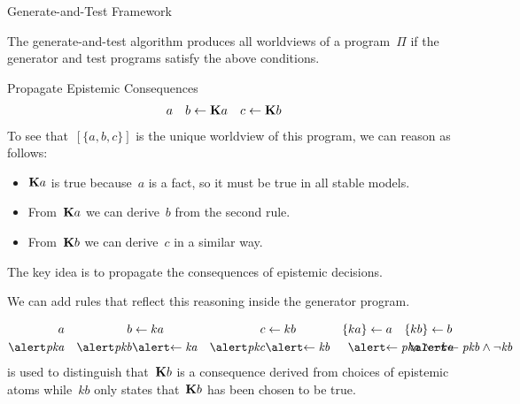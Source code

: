 \documentclass[aspectratio=169,svgnames,xcolor=table,t]{beamer}
\begin{document}
\begin{frame}{Generate-and-Test Framework}
    \vspace{10pt}

    \begin{theorem}
        The generate-and-test algorithm produces all worldviews of a program~$\Pi$ if the generator and test programs satisfy the above conditions.
    \end{theorem}
\end{frame}
\begin{frame}{Propagate Epistemic Consequences}
    \vspace{-20pt}
    \begin{align*}
        a &&
        b &\leftarrow \mathbf{K} a
        &
        c &\leftarrow \mathbf{K} b
    \end{align*}
    To see that~$[\{a,b,c\}]$ is the unique worldview of this program, we can reason as follows:
    \begin{itemize}
        \item $\mathbf{K} a$ is true because~$a$ is a fact, so it must be true in all stable models.
        \item From~$\mathbf{K} a$ we can derive~$b$ from the second rule. 
        \item From~$\mathbf{K} b$ we can derive~$c$ in a similar way.
    \end{itemize}
    
    \pause
    \pause
    \begin{myitemize}
        \item The key idea is to propagate the consequences of epistemic decisions.
        \item We can add rules that reflect this reasoning inside the generator program.
    \end{myitemize}
    \pause
    \begin{align*}
        a 
        && 
        b &\leftarrow ka
        &
        c &\leftarrow kb
        &
        \{ ka \} &\leftarrow a
        &
        \{ kb \} &\leftarrow b
        \\
        \hi{\kp{a}}&
        &
        \hi{\kp{b}} &\hi{\leftarrow \kk{a}}
        &
        \hi{\kp{c}} &\hi{\leftarrow \kk{b}}
        &
        \mathrlap{\hspace{-16pt}\hi{\leftarrow \kp{a} \wedge \neg ka}}
        &&
        \mathrlap{\hspace{-16pt}\hi{\leftarrow \kp{b} \wedge \neg \kk{b}}}
    \end{align*}
     is used to distinguish that~$\mathbf{K} b$ is a consequence derived from choices of epistemic atoms while~$kb$ only states that~$\mathbf{K} b$ has been chosen to be true.
\end{frame}
\end{document}
